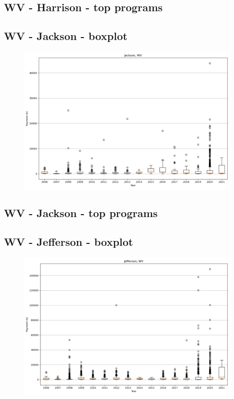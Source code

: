 \subsection*{WV - Harrison - top programs}

\newpage
\subsection*{WV - Jackson - boxplot}
\begin{figure}[h]
\centering
\includegraphics[width=7in]{../output/boxplots/counties/Jackson-WV_boxplot.png}
\end{figure}


\subsection*{WV - Jackson - top programs}

\newpage
\subsection*{WV - Jefferson - boxplot}
\begin{figure}[h]
\centering
\includegraphics[width=7in]{../output/boxplots/counties/Jefferson-WV_boxplot.png}
\end{figure}


